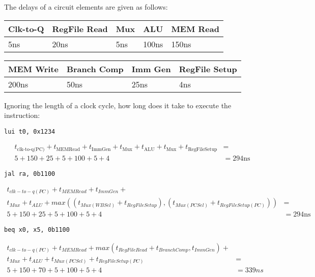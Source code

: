 \begin{blocksection}
The delays of a circuit elements are given as follows:

\begin{tabular}{ |l|l|l|l|l| } 
	\hline
	Clk-to-Q & RegFile Read & Mux & ALU & MEM Read \\ 
	\hline
	5ns & 20ns & 5ns & 100ns & 150ns \\ 
	\hline
\end{tabular}

\begin{tabular}{ |l|l|l|l| } 
	\hline
	MEM Write & Branch Comp & Imm Gen & RegFile Setup \\ 
	\hline
	200ns & 50ns & 25ns & 4ns \\ 
	\hline
\end{tabular}

\question
Ignoring the length of a clock cycle, how long does it take to execute the instruction:

\begin{parts}

	\item
	\lstinline$lui t0, 0x1234$
	\begin{solution}[0.3in]
		\begin{align*}
		t_{\text{clk-to-q(PC)}} + t_{\text{MEMRead}} + t_{\text{ImmGen}} + t_{\text{Mux}} + t_{\text{ALU}} + t_{\text{Mux}} + t_{\text{RegFileSetup}} &=\\
		5 + 150 + 25 + 5 + 100 + 5 + 4 &= 294\text{ns}
		\end{align*}
	\end{solution}

	\item
	\lstinline$jal ra, 0b1100$
	\begin{solution}[0.3in]
		\begin{align*}
		t_{clk-to-q(PC)} + t_{MEMRead} + t_{ImmGen} +\\
		 t_{Mux} + t_{ALU} + max((t_{Mux(WBSel)} + t_{RegFileSetup}), (t_{Mux(PCSel)} + t_{RegFileSetup(PC)})) &=\\
		5 + 150 + 25 + 5 + 100 + 5 + 4 &= 294\text{ns}
		\end{align*}
	\end{solution}


	\item
	\lstinline$beq x0, x5, 0b1100$
	\begin{solution}[0.5in]
		\begin{align*}
		t_{clk-to-q(PC)} + t_{MEMRead} + max(t_{RegFileRead} + t_{BranchComp}, t_{ImmGen}) +\\
		 t_{Mux} + t_{ALU} + t_{Mux(PCSel)} + t_{RegFileSetup(PC)} &=\\
		5 + 150 + 70 + 5 + 100 + 5 + 4 &= 339ns
		\end{align*}
	\end{solution}

\end{parts}
\end{blocksection}
